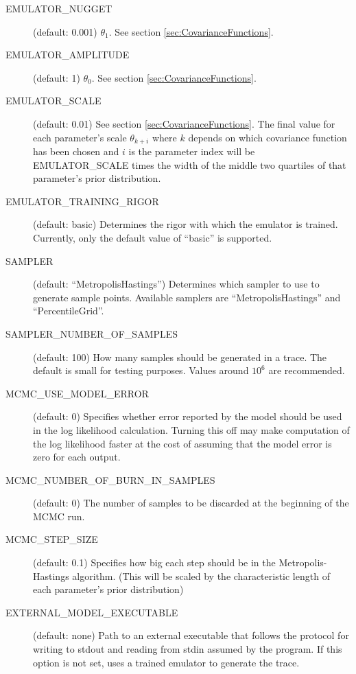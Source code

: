 \begin{description}
    \item[EMULATOR\_NUGGET] (default: 0.001) $\theta_1$. See section \ref{sec:CovarianceFunctions}.

    \item[EMULATOR\_AMPLITUDE] (default: 1) $\theta_0$. See section \ref{sec:CovarianceFunctions}.

    \item[EMULATOR\_SCALE] (default: 0.01) See section \ref{sec:CovarianceFunctions}. The final value for each parameter's scale $\theta_{k+i}$ where $k$ depends on which covariance function has been chosen and $i$ is the parameter index will be EMULATOR\_SCALE times the width of the middle two quartiles of that parameter's prior distribution.

    \item[EMULATOR\_TRAINING\_RIGOR] (default: basic) Determines the rigor with which the emulator is trained. Currently, only the default value of ``basic'' is supported.

    \item[SAMPLER] (default: ``MetropolisHastings'') Determines which sampler to use to generate sample points. Available samplers are ``MetropolisHastings'' and ``PercentileGrid''.

    \item[SAMPLER\_NUMBER\_OF\_SAMPLES] (default: 100) How many samples should be generated in a trace. The default is small for testing purposes. Values around $10^6$ are recommended.

    \item[MCMC\_USE\_MODEL\_ERROR] (default: 0) Specifies whether error reported by the model should be used in the log likelihood calculation. Turning this off may make computation of the log likelihood faster at the cost of assuming that the model error is zero for each output.

    \item[MCMC\_NUMBER\_OF\_BURN\_IN\_SAMPLES] (default: 0) The number of samples to be discarded at the beginning of the MCMC run.

    \item[MCMC\_STEP\_SIZE] (default: 0.1) Specifies how big each step should be in the Metropolis-Hastings algorithm. (This will be scaled by the characteristic length of each parameter's prior distribution)

    \item[EXTERNAL\_MODEL\_EXECUTABLE] (default: none) Path to an external executable that follows the protocol for writing to stdout and reading from stdin assumed by the  program. If this option is not set,  uses a trained emulator to generate the trace.


\end{description}
